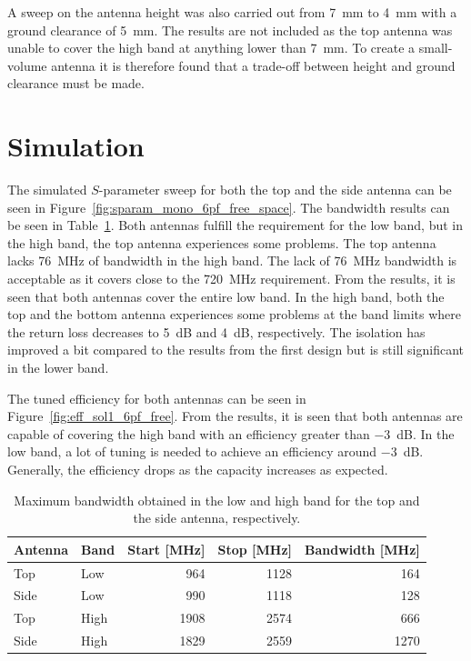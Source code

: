 A sweep on the antenna height was also carried out from \SI{7}{mm} to \SI{4}{mm} with a ground clearance of \SI{5}{mm}. The results are not included as the top antenna was unable to cover the high band at anything lower than \SI{7}{mm}. To create a small-volume antenna it is therefore found that a trade-off between height and ground clearance must be made.

\FloatBarrier
\section{Simulation}

The simulated $S$-parameter sweep for both the top and the side antenna can be seen in Figure~\ref{fig:sparam_mono_6pf_free_space}. The bandwidth results can be seen in Table~\ref{tab:bw_sol1_6pf}. Both antennas fulfill the requirement for the low band, but in the high band, the top antenna experiences some problems. The top antenna lacks \SI{76}{MHz} of bandwidth in the high band. The lack of \SI{76}{MHz} bandwidth is acceptable as it covers close to the \SI{720}{MHz} requirement.
From the results, it is seen that both antennas cover the entire low band. In the high band, both the top and the bottom antenna experiences some problems at the band limits where the return loss decreases to \SI{5}{dB} and \SI{4}{dB}, respectively. The isolation has improved a bit compared to the results from the first design but is still significant in the lower band.     

The tuned efficiency for both antennas can be seen in Figure~\ref{fig:eff_sol1_6pf_free}. From the results, it is seen that both antennas are capable of covering the high band with an efficiency greater than \SI{-3}{dB}. In the low band, a lot of tuning is needed to achieve an efficiency around \SI{-3}{dB}. Generally, the efficiency drops as the capacity increases as expected.

\begin{table}
  \centering
  \begin{tabular}{|l|l|r|r|r|}
    \hline
    Antenna & Band & Start [MHz] & Stop [MHz] & Bandwidth [MHz] \\
    \hline
    Top     & Low  & 964         & 1128      & 164 \\
    Side    & Low  & 990         & 1118      & 128 \\
    \hline
    Top     & High & 1908        & 2574       & 666 \\
    Side    & High & 1829        & 2559      & 1270 \\
    \hline
  \end{tabular}
  \caption{Maximum bandwidth obtained in the low and high band for the top and the side antenna, respectively.}
  \label{tab:bw_sol1_6pf}
\end{table}

